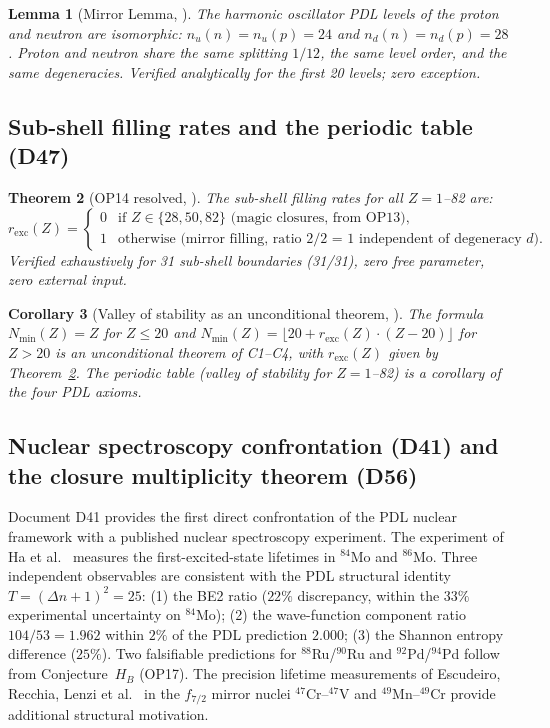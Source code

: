\documentclass[11pt,a4paper]{article}
\theoremstyle{plain}
\newtheorem{theorem}{Theorem}[section]
\newtheorem{corollary}[theorem]{Corollary}
\newtheorem{lemma}[theorem]{Lemma}
\theoremstyle{definition}
\theoremstyle{remark}
\begin{document}
\begin{lemma}[Mirror Lemma, \cite{D47}]
\label{lem:mirror}
The harmonic oscillator PDL levels of the proton and neutron are isomorphic: $n_u(n) = n_u(p) = 24$ and $n_d(n) = n_d(p) = 28$. Proton and neutron share the same splitting $1/12$, the same level order, and the same degeneracies. Verified analytically for the first 20 levels; zero exception.
\end{lemma}

\subsection{Sub-shell filling rates and the periodic table (D47)}
\label{subsec:fillingrates}
\begin{theorem}[OP14 resolved, \cite{D47}]
\label{thm:fillingrates}
The sub-shell filling rates for all $Z = 1$--82 are:
\begin{equation}
r_{\mathrm{exc}}(Z) = \begin{cases} 0 & \text{if } Z \in \{28, 50, 82\} \text{ (magic closures, from OP13)},\\ 1 & \text{otherwise (mirror filling, ratio 2/2 = 1 independent of degeneracy } d). \end{cases}
\end{equation}
Verified exhaustively for 31 sub-shell boundaries (31/31), zero free parameter, zero external input.
\end{theorem}

\begin{corollary}[Valley of stability as an unconditional theorem, \cite{D47}]
\label{cor:valley}
The formula $N_{\min}(Z) = Z$ for $Z \leq 20$ and $N_{\min}(Z) = \lfloor 20 + r_{\mathrm{exc}}(Z)\cdot(Z-20)\rfloor$ for $Z > 20$ is an unconditional theorem of C1--C4, with $r_{\mathrm{exc}}(Z)$ given by Theorem~\ref{thm:fillingrates}. The periodic table (valley of stability for $Z=1$--82) is a corollary of the four PDL axioms.
\end{corollary}

\subsection{Nuclear spectroscopy confrontation (D41) and the closure multiplicity theorem (D56)}
\label{subsec:d41}
Document D41 provides the first direct confrontation of the PDL nuclear framework with a published nuclear spectroscopy experiment. The experiment of Ha et al.~\cite{Ha2025} measures the first-excited-state lifetimes in $^{84}$Mo and $^{86}$Mo. Three independent observables are consistent with the PDL structural identity $T=(\Delta n+1)^2=25$: (1) the BE2 ratio ($22\%$ discrepancy, within the $33\%$ experimental uncertainty on $^{84}$Mo); (2) the wave-function component ratio $104/53 = 1.962$ within $2\%$ of the PDL prediction $2.000$; (3) the Shannon entropy difference ($25\%$). Two falsifiable predictions for $^{88}$Ru/$^{90}$Ru and $^{92}$Pd/$^{94}$Pd follow from Conjecture~$H_B$ (OP17). The precision lifetime measurements of Escudeiro, Recchia, Lenzi et al.~\cite{Escudeiro2026} in the $f_{7/2}$ mirror nuclei $^{47}$Cr--$^{47}$V and $^{49}$Mn--$^{49}$Cr provide additional structural motivation.
\end{document}

